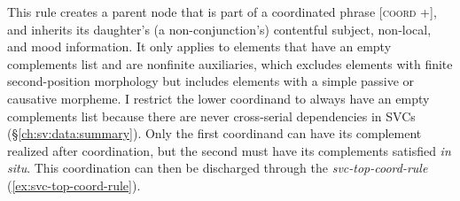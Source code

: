 This rule creates a parent node that is part of a coordinated phrase [\textsc{coord} +], and inherits its daughter's (a non-conjunction's) contentful subject, non-local, and mood information. It only applies to elements that have an empty complements list and are nonfinite auxiliaries, which excludes elements with finite second-position morphology but includes elements with a simple passive or causative morpheme. I restrict the lower coordinand to always have an empty complements list because there are never cross-serial dependencies in SVCs (\S\ref{ch:sv:data:summary}). Only the first coordinand can have its complement realized after coordination, but the second must have its complements satisfied \textit{in situ}. This coordination can then be discharged through the {\textit{svc-top-coord-rule}} (\ref{ex:svc-top-coord-rule}).

\begin{singlespacing}
\ex \label{ex:svc-top-coord-rule}
\xe
\end{singlespacing}

